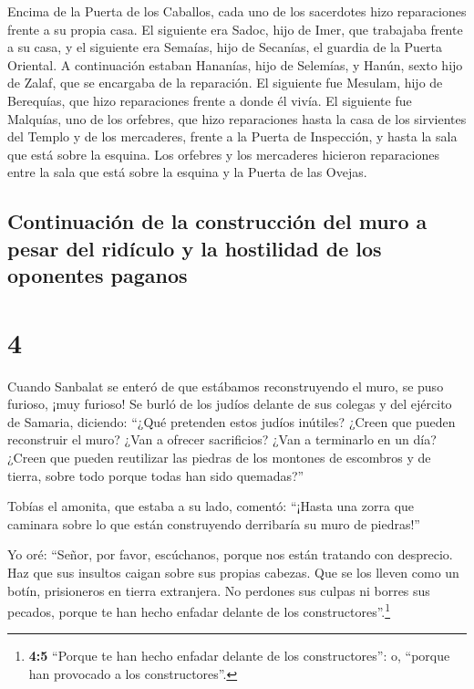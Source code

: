  Encima de la Puerta de los Caballos, cada uno de los
sacerdotes hizo reparaciones frente a su propia casa.  El
siguiente era Sadoc, hijo de Imer, que trabajaba frente a su casa, y el
siguiente era Semaías, hijo de Secanías, el guardia de la Puerta
Oriental.  A continuación estaban Hananías, hijo de
Selemías, y Hanún, sexto hijo de Zalaf, que se encargaba de la
reparación. El siguiente fue Mesulam, hijo de Berequías, que hizo
reparaciones frente a donde él vivía.  El siguiente fue
Malquías, uno de los orfebres, que hizo reparaciones hasta la casa de
los sirvientes del Templo y de los mercaderes, frente a la Puerta de
Inspección, y hasta la sala que está sobre la esquina. 
Los orfebres y los mercaderes hicieron reparaciones entre la sala que
está sobre la esquina y la Puerta de las Ovejas.

\hypertarget{continuaciuxf3n-de-la-construcciuxf3n-del-muro-a-pesar-del-riduxedculo-y-la-hostilidad-de-los-oponentes-paganos}{%
\subsection{Continuación de la construcción del muro a pesar del
ridículo y la hostilidad de los oponentes
paganos}\label{continuaciuxf3n-de-la-construcciuxf3n-del-muro-a-pesar-del-riduxedculo-y-la-hostilidad-de-los-oponentes-paganos}}

\hypertarget{section-3}{%
\section{4}\label{section-3}}

 Cuando Sanbalat se enteró de que estábamos reconstruyendo
el muro, se puso furioso, ¡muy furioso! Se burló de los judíos
 delante de sus colegas y del ejército de Samaria,
diciendo: ``¿Qué pretenden estos judíos inútiles? ¿Creen que pueden
reconstruir el muro? ¿Van a ofrecer sacrificios? ¿Van a terminarlo en un
día? ¿Creen que pueden reutilizar las piedras de los montones de
escombros y de tierra, sobre todo porque todas han sido quemadas?''

 Tobías el amonita, que estaba a su lado, comentó:
``¡Hasta una zorra que caminara sobre lo que están construyendo
derribaría su muro de piedras!''

 Yo oré: ``Señor, por favor, escúchanos, porque nos están
tratando con desprecio. Haz que sus insultos caigan sobre sus propias
cabezas. Que se los lleven como un botín, prisioneros en tierra
extranjera.  No perdones sus culpas ni borres sus pecados,
porque te han hecho enfadar delante de los constructores''.\footnote{\textbf{4:5}
  ``Porque te han hecho enfadar delante de los constructores'': o,
  ``porque han provocado a los constructores''.}

